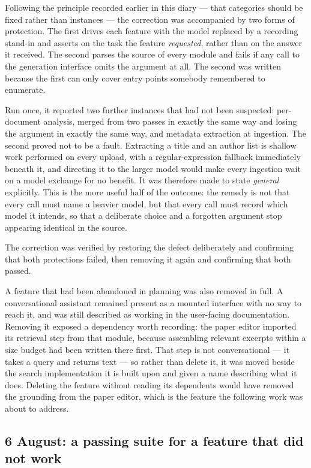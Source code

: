 \documentclass[11pt,a4paper]{article}
\begin{document}
Following the principle recorded earlier in this diary --- that categories
should be fixed rather than instances --- the correction was accompanied by two
forms of protection. The first drives each feature with the model replaced by a
recording stand-in and asserts on the task the feature \emph{requested}, rather
than on the answer it received. The second parses the source of every module and
fails if any call to the generation interface omits the argument at all. The
second was written because the first can only cover entry points somebody
remembered to enumerate.

Run once, it reported two further instances that had not been suspected:
per-document analysis, merged from two passes in exactly the same way and losing
the argument in exactly the same way, and metadata extraction at ingestion. The
second proved not to be a fault. Extracting a title and an author list is
shallow work performed on every upload, with a regular-expression fallback
immediately beneath it, and directing it to the larger model would make every
ingestion wait on a model exchange for no benefit. It was therefore made to
state \emph{general} explicitly. This is the more useful half of the outcome:
the remedy is not that every call must name a heavier model, but that every call
must record which model it intends, so that a deliberate choice and a forgotten
argument stop appearing identical in the source.

The correction was verified by restoring the defect deliberately and confirming
that both protections failed, then removing it again and confirming that both
passed.

A feature that had been abandoned in planning was also removed in full. A
conversational assistant remained present as a mounted interface with no way to
reach it, and was still described as working in the user-facing documentation.
Removing it exposed a dependency worth recording: the paper editor imported its
retrieval step from that module, because assembling relevant excerpts within a
size budget had been written there first. That step is not conversational --- it
takes a query and returns text --- so rather than delete it, it was moved beside
the search implementation it is built upon and given a name describing what it
does. Deleting the feature without reading its dependents would have removed
the grounding from the paper editor, which is the feature the following work was
about to address.


\subsection{6 August: a passing suite for a feature that did not work}
\end{document}
